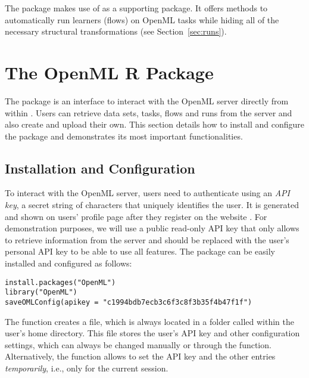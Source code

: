 The  package makes use of  as a supporting package. It
offers methods to automatically run  learners (flows) on OpenML
tasks while hiding all of the necessary structural transformations (see Section~\ref{sec:runs}).



\section{The OpenML R Package}
\label{sec:package}

The   package \citet{casalicchio17} is an interface to interact with
the OpenML server directly from within . Users can retrieve
data sets, tasks, flows and runs from the server and also create and upload
their own. This section details how to install and configure the package
and demonstrates its most important functionalities.


\subsection{Installation and Configuration}
\label{sec:config}
To interact with the OpenML server, users need to authenticate using an \emph{API key},
a secret string of characters that uniquely identifies the user. It is generated and shown
on users' profile page after they register on the website . For demonstration
purposes, we will use a public read-only API key that only allows to retrieve
information from the server and should be replaced with the user's personal API key to be able to use all features.
The  package can be easily installed and configured as follows:

\begin{knitrout}\small
{}\color{fgcolor}\begin{kframe}
\begin{verbatim}
install.packages("OpenML")
library("OpenML")
saveOMLConfig(apikey = "c1994bdb7ecb3c6f3c8f3b35f4b47f1f")
\end{verbatim}
\end{kframe}
\end{knitrout}



The  function creates a  file,
which is always located in a folder called  within the user's home
directory. This file stores the user's API key and other configuration settings, which
can always be changed manually or through the  function.
Alternatively, the  function allows to set the API key and
the other entries \emph{temporarily}, i.e., only for the current  session.


